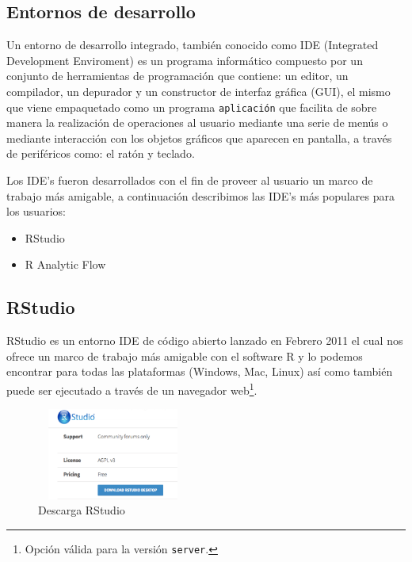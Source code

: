 \documentclass[11pt,a4paper,oneside]{book}\usepackage[]{graphicx}\usepackage[]{color}
\begin{document}
\begin{itemize}
\chapter{Entornos de desarrollo}

Un entorno de desarrollo integrado, también conocido como IDE (Integrated Development Enviroment) es un programa informático compuesto por un conjunto de herramientas de programación que contiene: un editor, un compilador, un depurador y un constructor de interfaz gráfica (GUI), el mismo que viene empaquetado como un programa \texttt{aplicación} que facilita de sobre manera la realización de operaciones al usuario mediante una serie de menús o mediante interacción con los objetos gráficos que aparecen en pantalla, a través de periféricos como: el ratón y teclado.\newline

Los IDE's fueron desarrollados con el fin de proveer al usuario un marco de trabajo más amigable, a continuación describimos las IDE's más populares para los usuarios:
\begin{multicols}{2}
\begin{itemize}
  \item RStudio
  \item R Analytic Flow
\end{itemize}
\end{multicols}

\section{RStudio}

RStudio es un entorno IDE de código abierto lanzado en Febrero 2011 el cual nos ofrece un marco de trabajo más amigable con el software R y lo podemos encontrar para todas las plataformas (Windows, Mac, Linux) así como también puede ser ejecutado a través de un navegador web\footnote{Opción válida para la versión \texttt{server}.}.

\begin{figure}[H]
\centering
\includegraphics[width=5cm, height=3cm]{figuras/rstudio_install.eps}
\caption{Descarga RStudio}
\label{drstudio}
\end{figure}


\end{itemize}
\end{document}
